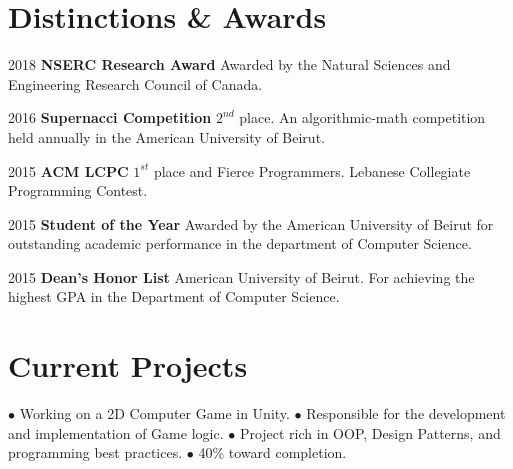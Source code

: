 \documentclass{tccv}
\begin{document}
\section{Distinctions \& Awards}
\begin{factlist}
   
\item{2018}
    {\textbf{NSERC Research Award}\hfill\break
    Awarded by the Natural Sciences and Engineering Research Council of Canada.
    }


\item{2016}
    {\textbf{Supernacci Competition}\hfill\break
     $2^{nd}$ place. An algorithmic-math competition held annually in the American University of Beirut.} 
\item{2015}
    {\textbf{ACM LCPC}\hfill\break
     $1^{st}$ place and Fierce Programmers. Lebanese Collegiate Programming Contest.}
\item{2015}
    {\textbf{Student of the Year}\hfill\break
     Awarded by the American University of Beirut for outstanding academic performance in the department of Computer Science.}
\item{2015}
    {\textbf{Dean's Honor List}\hfill\break
     American University of Beirut. For achieving the highest GPA in the Department of Computer Science.}


\end{factlist}


\section{\break Current Projects}
{$\bullet$ Working on a 2D Computer Game in Unity. \hfill\break
$\bullet$ Responsible for the development and implementation of Game logic. \hfill\break
$\bullet$ Project rich in OOP, Design Patterns, and programming best practices. \hfill\break
$\bullet$ 40\% toward completion.
}
\end{document}
